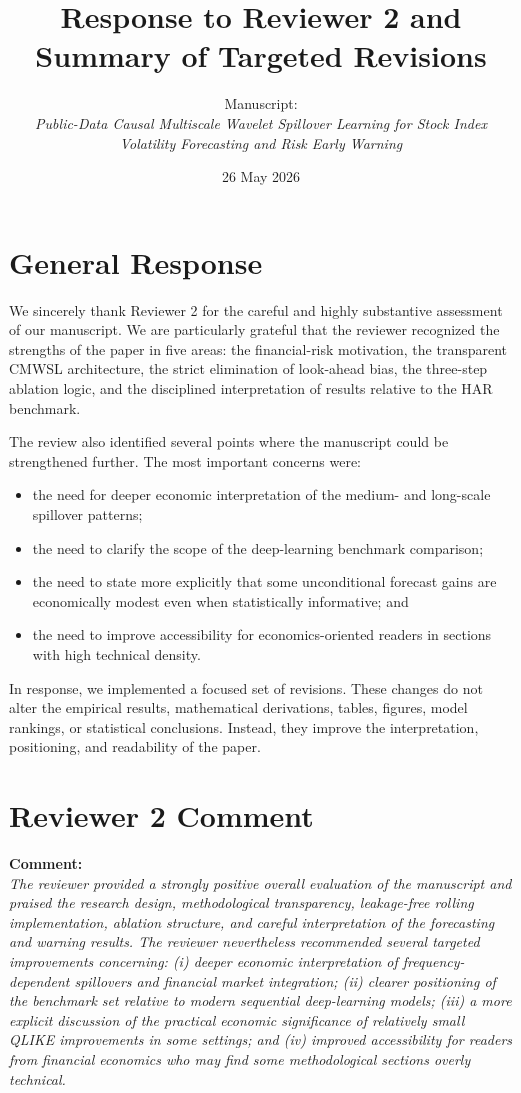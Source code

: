 \documentclass[11pt,a4paper]{article}
\title{Response to Reviewer 2 and Summary of Targeted Revisions}
\author{\parbox{0.92\textwidth}{\centering Manuscript:\\[2pt]\textit{Public-Data Causal Multiscale Wavelet Spillover Learning for Stock Index Volatility Forecasting and Risk Early Warning}}}
\date{26 May 2026}
\begin{document}
\maketitle

\section*{General Response}

We sincerely thank Reviewer 2 for the careful and highly substantive assessment of our manuscript. We are particularly grateful that the reviewer recognized the strengths of the paper in five areas: the financial-risk motivation, the transparent CMWSL architecture, the strict elimination of look-ahead bias, the three-step ablation logic, and the disciplined interpretation of results relative to the HAR benchmark.

The review also identified several points where the manuscript could be strengthened further. The most important concerns were:
\begin{itemize}[leftmargin=1.5em]
\item the need for deeper economic interpretation of the medium- and long-scale spillover patterns;
\item the need to clarify the scope of the deep-learning benchmark comparison;
\item the need to state more explicitly that some unconditional forecast gains are economically modest even when statistically informative; and
\item the need to improve accessibility for economics-oriented readers in sections with high technical density.
\end{itemize}

In response, we implemented a focused set of revisions. These changes do not alter the empirical results, mathematical derivations, tables, figures, model rankings, or statistical conclusions. Instead, they improve the interpretation, positioning, and readability of the paper.

\section*{Reviewer 2 Comment}

\textbf{Comment:} \\
\emph{The reviewer provided a strongly positive overall evaluation of the manuscript and praised the research design, methodological transparency, leakage-free rolling implementation, ablation structure, and careful interpretation of the forecasting and warning results. The reviewer nevertheless recommended several targeted improvements concerning: (i) deeper economic interpretation of frequency-dependent spillovers and financial market integration; (ii) clearer positioning of the benchmark set relative to modern sequential deep-learning models; (iii) a more explicit discussion of the practical economic significance of relatively small QLIKE improvements in some settings; and (iv) improved accessibility for readers from financial economics who may find some methodological sections overly technical.}
\end{document}
